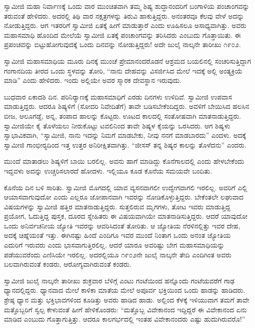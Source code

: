  ಸ್ವಾಮೀಜಿ ಮಹಾ ನಿರ್ವಾಣಕ್ಕೆ ಒಂದು ವಾರ ಮುಂಚಿತವಾಗಿ ತಮ್ಮ ಶಿಷ್ಯ ಶುದ್ಧಾನಂದರಿಗೆ ಬಂಗಾಳಿಯ ಪಂಚಾಂಗವನ್ನು ತರುವಂತೆ ಹೇಳಿದರು. ಅದರಲ್ಲಿ ತಿಥಿ ವಾರ ನಕ್ಷತ್ರಗಳನ್ನು ತಿರುವಿ ಹಾಕುತ್ತಿದ್ದರು. ಅನಂತರವೂ ಕೆಲವು ವೇಳೆ ಅದನ್ನು ನೋಡುತ್ತಿದ್ದರು. ಆಗ ಇತರರಿಗೆ ಸ್ವಾಮೀಜಿ ಏತಕ್ಕೆ ಹೀಗೆ ಮಾಡುತ್ತಾರೆ ಎಂದು ಊಹಿಸಲೂ ಅಸಾಧ್ಯವಾಗಿತ್ತು. ಅವರು ಮಹಾಸಮಾಧಿ ಹೊಂದಿದ ಮೇಲೆಯೆ ಸ್ವಾಮೀಜಿ ಏತಕ್ಕೆ ಪಂಚಾಂಗವನ್ನು ತರಿಸಿದರು ಎಂಬುದು ಗೊತ್ತಾಯಿತು. ಈ ಪ್ರಪಂಚವನ್ನು ಬಿಟ್ಟುಹೋಗುವುದಕ್ಕೆ ಒಂದು ದಿನವನ್ನು ನೋಡುತ್ತಿದ್ದರು! ಅದೇ ಜುಲೈ ನಾಲ್ಕನೇ ತಾರೀಖು ೧೯೦೨. 

 ಸ್ವಾಮೀಜಿ ಮಹಾಸಮಾಧಿಯ ಮೂರು ದಿನಕ್ಕೆ ಮುಂಚೆ ಪ್ರೇಮಾನಂದರೊಡನೆ ಆಶ್ರಮದ ಬಯಲಿನಲ್ಲಿ ಸಂಚರಿಸುತ್ತಿದ್ದಾಗ ಗಂಗಾನದಿಯ ತೀರದ ಒಂದು ಸ್ಥಳವನ್ನು ತೋರಿ, “ನಾನು ದೇಹವನ್ನು ವಿಸರ್ಜಿಸಿದ ಮೇಲೆ ಇದಕ್ಕೆ ಅಲ್ಲಿ ಅಂತ್ಯಕ್ರಿಯೆ ಮಾಡಿ” ಎಂದು ಹೇಳಿದರು. ಇಂದು ಅಲ್ಲಿಯೇ ಅವರ ಸ್ಮಾರಕ ದೇವಸ್ಥಾನ ಇರುವುದು. 

 ಬುಧವಾರ ಏಕಾದಶಿ ದಿನ. ಪರಿನಿರ‍್ಯಾಣಕ್ಕೆ ಮಹಾಸಮಾಧಿಗೆ ಎರಡು ದಿನಗಳು ಉಳಿದಿವೆ. ಸ್ವಾಮೀಜಿ ಉಪವಾಸ ಮಾಡುತ್ತಿದ್ದರು. ಆದರೂ ಶಿಷ್ಯಳಿಗೆ (ಸೋದರಿ ನಿವೇದಿತೆಗೆ) ತಾವೇ ಬಡಿಸಬೇಕೆಂದಿದ್ದರು. ಅವಳಿಗೆ ಬೇಯಿಸಿದ ಹಲಸಿನ ಬೀಜ, ಆಲೂಗಡ್ಡೆ, ಅನ್ನ, ತಂಪಾದ ಹಾಲನ್ನು ಕೊಟ್ಟರು. ಊಟದ ಕಾಲದಲ್ಲಿ ಸಂತೋಷವಾಗಿ ಮಾತನಾಡುತ್ತಿದ್ದರು. ಸ್ವಾಮೀಜಿಯೇ ಕೈ ತೊಳೆಯಲು ನೀರುಕೊಟ್ಟು ಟವಲಿನಿಂದ ತಾವೇ ಶಿಷ್ಯಳ ಕೈಯನ್ನು ಒರಸಿದರು. ಆಗ ಶಿಷ್ಯಳು ಸ್ವಾಭಾವಿಕವಾಗಿ, “ಸ್ವಾಮೀಜಿ, ನಾನು ಇದನ್ನು ನಿಮಗೆ ಮಾಡಬೇಕು, ನೀವು ನನಗೆ ಮಾಡಬಾರದು” ಎಂದಳು. ಅದಕ್ಕೆ ಸ್ವಾಮೀಜಿ ಗಾಂಭೀರ‍್ಯದಿಂದ ಇತ್ತ ಉತ್ತರ ಅನಿರೀಕ್ಷಿತವಾಗಿತ್ತು. “ಜೀಸಸ್ ತನ್ನ ಶಿಷ್ಯರ ಕಾಲನ್ನು ತೊಳೆದನು” ಎಂದರು. 

 ಮುಂದೆ ಮಾತಾಡಲು ಶಿಷ್ಯಳಿಗೆ ಬಾಯಿ ಬರಲಿಲ್ಲ. ಅವನು ಹಾಗೆ ಮಾಡಿದ್ದು ಕೊನೆಗಾಲದಲ್ಲಿ ಎಂದು ಹೇಳಬೇಕೆಂದು ಇದ್ದವಳು ಅದನ್ನು ಉಚ್ಚರಿಸಲಾರದೆ ಹೋದಳು. ಇಲ್ಲಿಯೂ ಕೂಡ ಕೊನೆಯ ಸಮಯವೇ ಬಂದಿತು. 

 ಕೊನೆಯ ದಿನ ಬಳಿ ಸಾರಿತು. ಸ್ವಾಮೀಜಿ ಮೊಗದಲ್ಲಿ ಯಾವ ವ್ಯಸನವಾಗಲೀ ಉದ್ವೇಗವಾಗಲಿ ಇರಲಿಲ್ಲ. ಅವರಿಗೆ ಎಲ್ಲಿ ಆಯಾಸವಾಗುವುದೋ ಎಂದು ಎಲ್ಲರೂ ಜೋಪಾನವಾಗಿ ಇವರನ್ನು ನೋಡಿಕೊಳ್ಳುತ್ತಿದ್ದರು. ಬೇಕೆಂತಲೇ ಲಘುವಾದ ವಿಷಯಗಳನ್ನು ಸ್ವಾಮೀಜಿ ಹತ್ತಿರ ಮಾತನಾಡುತ್ತಿದ್ದರು. ಸುತ್ತಲಿರುವ ಮೃಗಗಳು, ತೋಟ ಇವರು ಮಾಡುತ್ತಿದ್ದ ಪ್ರಯೋಗ, ಓದುತ್ತಿದ್ದ ಪುಸ್ತಕ, ದೂರದ ಸ್ನೇಹಿತರು ಈ ವಿಷಯವಾಗಿಯೇ ಮಾತನಾಡಿಸುತ್ತಿದ್ದರು. ಆದರೆ ಯಾವುದೋ ಒಂದು ಅನಿರ್ವಚನೀಯ ಜ್ಯೋತಿ ಇವರನ್ನು ಆವರಿಸಿದಂತೆ ತೋರಿತು. ಆ ಜ್ಯೋತಿಯ ನೆರಳಿನಲ್ಲಿತ್ತು ಇವರ ದೇಹ, ಅದಕ್ಕೆ ಚಿಹ್ನೆಯಂತೆ ಇತ್ತು. ಈಗಿನಷ್ಟು ಹಿಂದೆ ಎಂದಿಗೂ ಇವರ ಮುಂದೆ ನಿಂತಾಗ ಒಂದು ಅನಂತ ಜ್ಯೋತಿಯ ಎದುರಿಗೆ ಇರುವರು ಎಂದು ಭಾಸವಾಗುತ್ತಿರಲಿಲ್ಲ. ಆದರೆ ಯಾರೂ ಅವರಿಷ್ಟು ಬೇಗ ಮಹಾಸಮಾಧಿಯನ್ನು ಪಡೆಯುವರೆಂದು ಎಣಿಸಿಯೇ ಇರಲಿಲ್ಲ. ಅದರಲ್ಲಿಯೂ ೧೯೦೨ನೇ ಜುಲೈ ನಾಲ್ಕನೇ ತೇದಿ ಎಂದಿಗಿಂತ ಅವರು ಬಲವಾಗಿರುವಂತೆ ಕಂಡರು, ಆರೋಗ್ಯವಾಗಿರುವಂತೆ ಕಂಡರು. 

 ಸ್ವಾಮೀಜಿ ಜುಲೈ ನಾಲ್ಕನೇ ತಾರೀಖು ಶುಕ್ರವಾರ ಬೆಳಿಗ್ಗೆ ಎಂಟು ಗಂಟೆಯಿಂದ ಹನ್ನೊಂದು ಗಂಟೆಯವರೆಗೆ ಗಾಢ ಧ್ಯಾನದಲ್ಲಿದ್ದರು. ಧ್ಯಾನವಾದ ಮೇಲೆ ಕಾಳಿಕಾ ಮಾತೆಯ ಮೇಲೆ ಅಪೂರ್ವ ಭಕ್ತಿಯಿಂದ ಒಂದು ಹಾಡನ್ನು ಹಾಡಿದರು. ಶ್ರೇಷ್ಠ ಧ್ಯಾನ ಮತ್ತು ಭಕ್ತಿಭಾವಗಳಿಂದ ಕೂಡಿತ್ತು ಅವರು ಹಾಡಿದ ಹಾಡು. ಅಲ್ಲಿಂದ ಕೆಳಕ್ಕೆ ಇಳಿಯುವಾಗ ತಮಗೆ ತಾವೇ ಮತ್ತೊಬ್ಬರಿಗೆ ಸ್ವಲ್ಪ ಕೇಳುವಂತೆ ಹೀಗೆ ಹೇಳಿಕೊಂಡರು: “ಮತ್ತೊಬ್ಬ ವಿವೇಕಾನಂದ ಇದ್ದಿದ್ದರೆ ಈ ವಿವೇಕಾನಂದ ಏನು ಮಾಡಿದ ಎಂಬುದು ಗೊತ್ತಾಗುತ್ತಿತ್ತು. ಆದರೂ ಕಾಲಗರ್ಭದಲ್ಲಿ ಇಂತಹ ವಿವೇಕಾನಂದರು ಎಷ್ಟು ಹುದುಗಿರುವರೊ!” 

